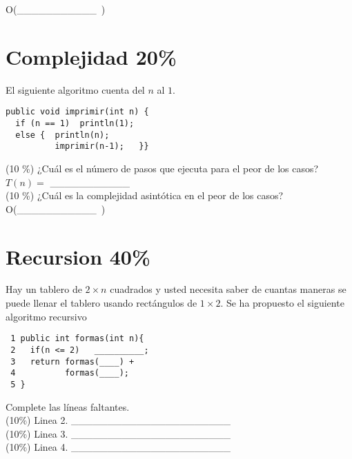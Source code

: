 \documentclass[twocolumn]{article}
\begin{document}
O(\_\_\_\_\_\_\_\_\_\_\_\ )


\section{Complejidad 20\%}

El siguiente algoritmo cuenta del $n$ al $1$.

{\small
\begin{verbatim}
public void imprimir(int n) {
  if (n == 1)  println(1);
  else {  println(n);
          imprimir(n-1);   }}
\end{verbatim}
}

(10 \%) ¿Cuál es el número de pasos que ejecuta para el peor de los casos?\\

$T(n) =$ \_\_\_\_\_\_\_\_\_\_\_\ \\

(10 \%) ¿Cuál es la complejidad asintótica en el peor de los casos?\\

O(\_\_\_\_\_\_\_\_\_\_\_\ )





\section{Recursion 40\%}

Hay un tablero de $2 \times n$ cuadrados y usted necesita saber de cuantas maneras se puede llenar el tablero usando rectángulos de $1 \times 2$. Se ha propuesto el siguiente algoritmo 
recursivo


\begin{verbatim}
 1 public int formas(int n){
 2   if(n <= 2)   __________;
 3   return formas(____) +                                  
 4          formas(____);
 5 }
\end{verbatim}



Complete las líneas faltantes.\\


 (10\%) Linea 2. \_\_\_\_\_\_\_\_\_\_\_\_\_\_\_\_\_\_\_\_\_\_ \\

 (10\%) Linea 3. \_\_\_\_\_\_\_\_\_\_\_\_\_\_\_\_\_\_\_\_\_\_ \\

(10\%) Linea 4. \_\_\_\_\_\_\_\_\_\_\_\_\_\_\_\_\_\_\_\_\_\_ \\
\end{document}
